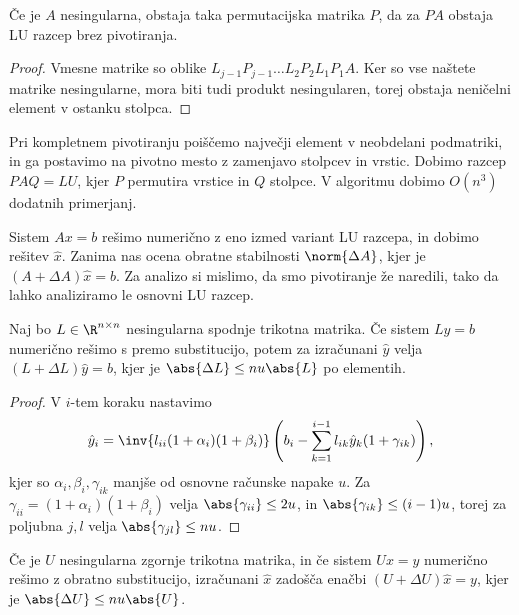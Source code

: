 \begin{lema}
  Če je $A$ nesingularna, obstaja taka permutacijska matrika $P$, da za $PA$
  obstaja LU razcep brez pivotiranja.
\end{lema}

\begin{proof}
  Vmesne matrike so oblike $L_{j-1} P_{j-1} \ldots L_2 P_2 L_1 P_1 A$.
  Ker so vse naštete matrike nesingularne, mora biti tudi produkt nesingularen,
  torej obstaja neničelni element v ostanku stolpca.
\end{proof}


Pri kompletnem pivotiranju poiščemo največji element v neobdelani podmatriki, in
ga postavimo na pivotno mesto z zamenjavo stolpcev in vrstic.
Dobimo razcep $PAQ = LU$, kjer $P$ permutira vrstice in $Q$ stolpce.
V algoritmu dobimo $O(n^3)$ dodatnih primerjanj.


Sistem $Ax = b$ rešimo numerično z eno izmed variant LU razcepa, in dobimo
rešitev $\hat{x}$.
Zanima nas ocena obratne stabilnosti $\norm{\Delta A}$, kjer je $(A + \Delta A)
\hat{x} = b$.
Za analizo si mislimo, da smo pivotiranje že naredili, tako da lahko analiziramo
le osnovni LU razcep.

\begin{lema}
  Naj bo $L \in \R^{n \times n}$ nesingularna spodnje trikotna matrika.
  Če sistem $Ly = b$ numerično rešimo s premo substitucijo, potem za izračunani
  $\hat{y}$ velja $(L+\Delta L)\hat{y} = b$, kjer je $\abs{\Delta L} \le n u
  \abs{L}$ po elementih.
\end{lema}

\begin{proof}
  V $i$-tem koraku nastavimo
  \[
	\hat{y}_i = \inv{l_{ii} (1 + \alpha_i) (1 + \beta_i)}
	\left( b_i - \sum_{k=1}^{i-1} l_{ik} \hat{y}_k (1 + \gamma_{ik}) \right),
  \]
  kjer so $\alpha_i, \beta_i, \gamma_{ik}$ manjše od osnovne računske napake
  $u$.
  Za $\gamma_{ii} = (1 + \alpha_i) (1 + \beta_i)$ velja $\abs{\gamma_{ii}} \le
  2u$, in $\abs{\gamma_{ik}} \le (i-1) u$, torej za poljubna $j,l$ velja
  $\abs{\gamma_{jl}} \le nu$.
\end{proof}

\begin{lema}
  Če je $U$ nesingularna zgornje trikotna matrika, in če sistem $Ux = y$
  numerično rešimo z obratno substitucijo, izračunani $\hat{x}$ zadošča enačbi
  $(U + \Delta U) \hat{x} = y$, kjer je $\abs{\Delta U} \le nu \abs{U}$.
\end{lema}


